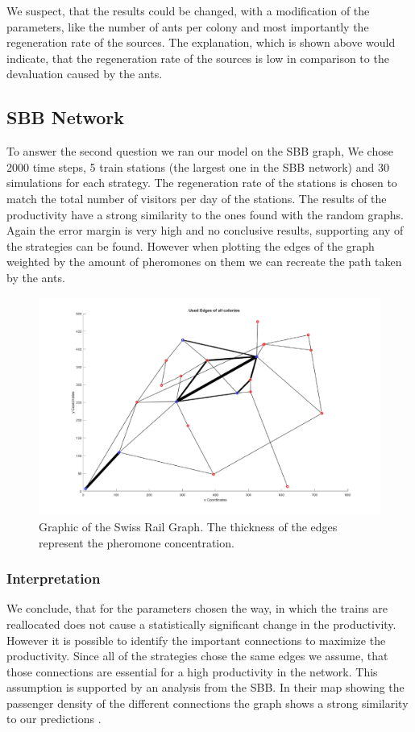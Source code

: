We suspect, that the results could be changed, with a modification of the parameters, like the number of ants per colony and most importantly the regeneration rate of the sources. The explanation, which is shown above would indicate, that the regeneration rate of the sources is low in comparison to the devaluation caused by the ants.

\subsection{SBB Network}
To answer the second question we ran our model on the SBB graph, We chose 2000 time steps, 5 train stations (the largest one in the SBB network) and 30 simulations for each strategy. The regeneration rate of the stations is chosen to match the total number of visitors per day of the stations. The results of the productivity have a strong similarity to the ones found with the random graphs. Again the error margin is very high and no conclusive results, supporting any of the strategies can be found. However when plotting the edges of the graph weighted by the amount of pheromones on them we can recreate the path taken by the ants.
\begin{figure}[H]
	\centering
	\includegraphics[scale=0.8]{sbbWeighted.pdf}
	\caption{Graphic of the Swiss Rail Graph. The thickness of the edges represent the pheromone concentration.}
\end{figure}

\subsubsection{Interpretation}
We conclude, that for the parameters chosen the way, in which the trains are reallocated does not cause a statistically significant change in the productivity. However it is possible to identify the important connections to maximize the productivity. Since all of the strategies chose the same edges we assume, that those connections are essential for a high productivity in the network. This assumption is supported by an analysis from the SBB. In their map showing the passenger density of the different connections the graph shows a strong similarity to our predictions \citep{SbbStats4}. 